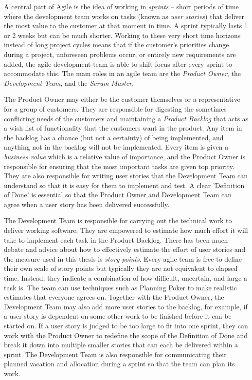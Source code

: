 
A central part of Agile is the idea of working in \emph{sprints} -- short periods of time where the development team works on tasks (known as \emph{user stories}) that deliver the most value to the customer at that moment in time. A sprint typically lasts 1 or 2 weeks but can be much shorter. Working to these very short time horizons instead of long project cycles means that if the customer's priorities change during a project, unforeseen problems occur, or entirely new requirements are added, the agile development team is able to shift focus after every sprint to accommodate this. The main roles in an agile team are the \emph{Product Owner}, the \emph{Development Team}, and the \emph{Scrum Master}.

The Product Owner may either be the customer themselves or a representative for a group of customers. They are responsible for digesting the sometimes conflicting needs of the customers and maintaining a \emph{Product Backlog} that acts as a wish list of functionality that the customers want in the product. Any item in the backlog has a chance (but not a certainty) of being implemented, and anything not in the backlog will not be implemented. Every item is given a \emph{business value} which is a relative value of importance, and the Product Owner is responsible for ensuring that the most important tasks are given top priority. They are also responsible for writing user stories that the Development Team can understand so that it is easy for them to implement and test. A clear 'Definition of Done' is essential so that the Product Owner and Development Team can agree when a user story has been delivered successfully.

The Development Team is responsible for carrying out the technical work to deliver working software. They are empowered to estimate how much effort it will take to implement each task in the Product Backlog. There has been much debate and advice about how to effectively estimate the effort of user stories \citep{cohn2004user} and the measure used in this thesis is \emph{story points}. Every agile team is free to define their own scale of story points but typically they are not equivalent to elapsed time. Instead, they indicate a combination of how difficult, uncertain, and large a task is. The team can use techniques such as Planning Poker \citep{cohn_planning_poker} to make realistic estimates that everyone agrees on. Together with the Product Owner, the Development Team may also add more user stories to the backlog, for example, if a user story is dependent on some other work to be finished before it can be started on. If a user story is judged to be too large to fit into one sprint, they can work with the Product Owner to redefine the scope of the Definition of Done and break it down into multiple smaller stories that can each be delivered within a sprint. The Development Team is also responsible for communicating their planned vacation and allocation during a sprint so that the team can plan its work.

